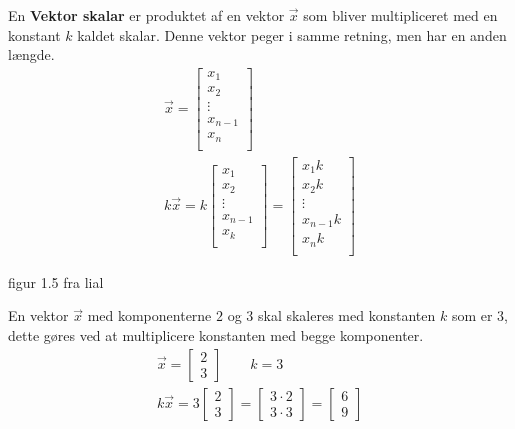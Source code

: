 \begin{defn}
En \textbf{Vektor skalar} er produktet af en vektor $\vec{x}$
som bliver multipliceret med en konstant $k$ kaldet skalar. Denne vektor peger i samme retning, men har en anden længde.
\begin{align*}
\vec{x}=\begin{bmatrix}
x_1\\
x_2\\
\vdots\\
x_{n-1}\\
x_n\\
\end{bmatrix}\\
k\vec{x}=k\begin{bmatrix}
x_1\\
x_2\\
\vdots\\
x_{n-1}\\
x_k\\
\end{bmatrix}=
\begin{bmatrix}
x_1k\\
x_2k\\
\vdots\\
x_{n-1}k\\
x_nk\\
\end{bmatrix}
\end{align*}
\end{defn}
figur 1.5 fra lial
\begin{eks}
En vektor $\vec{x}$ med komponenterne $2$ og $3$ skal skaleres med konstanten $k$ som er $3$, dette gøres ved at multiplicere konstanten med begge komponenter.
\begin{align*}
\vec{x}=\begin{bmatrix}
2\\
3
\end{bmatrix}\qquad k=3\\
k\vec{x}=3
\begin{bmatrix}
2\\
3
\end{bmatrix}
=
\begin{bmatrix}
3\cdot2\\
3\cdot3
\end{bmatrix}
=
\begin{bmatrix}
6\\
9
\end{bmatrix}
\end{align*}
\end{eks}
